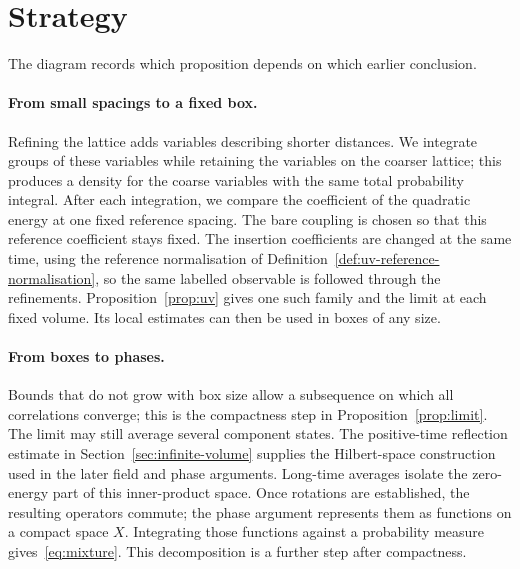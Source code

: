 \section{Strategy}\label{sec:strategy}

The diagram records which proposition depends on which earlier conclusion.

\paragraph{From small spacings to a fixed box.}
Refining the lattice adds variables describing shorter distances.
We integrate groups of these variables while retaining the variables on the coarser lattice; this produces a density for the coarse variables with the same total probability integral.
After each integration, we compare the coefficient of the quadratic energy at one fixed reference spacing.
The bare coupling is chosen so that this reference coefficient stays fixed.
The insertion coefficients are changed at the same time, using the reference normalisation of Definition~\ref{def:uv-reference-normalisation}, so the same labelled observable is followed through the refinements.
Proposition~\ref{prop:uv} gives one such family and the limit at each fixed volume.
Its local estimates can then be used in boxes of any size.

\paragraph{From boxes to phases.}
Bounds that do not grow with box size allow a subsequence on which all correlations converge; this is the compactness step in Proposition~\ref{prop:limit}.
The limit may still average several component states.
The positive-time reflection estimate in Section~\ref{sec:infinite-volume} supplies the Hilbert-space construction used in the later field and phase arguments.
Long-time averages isolate the zero-energy part of this inner-product space.
Once rotations are established, the resulting operators commute; the phase argument represents them as functions on a compact space $X$.
Integrating those functions against a probability measure gives~\eqref{eq:mixture}.
This decomposition is a further step after compactness.

